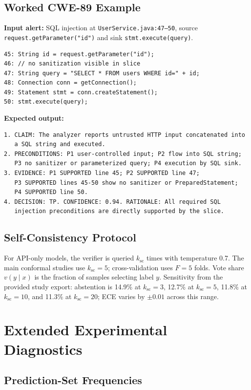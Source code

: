 \subsection{Worked CWE-89 Example}

\textbf{Input alert:} SQL injection at \texttt{UserService.java:47--50}, source \texttt{request.getParameter("id")} and sink \texttt{stmt.execute(query)}.

\begin{verbatim}
45: String id = request.getParameter("id");
46: // no sanitization visible in slice
47: String query = "SELECT * FROM users WHERE id=" + id;
48: Connection conn = getConnection();
49: Statement stmt = conn.createStatement();
50: stmt.execute(query);
\end{verbatim}

\textbf{Expected output:}
\begin{verbatim}
1. CLAIM: The analyzer reports untrusted HTTP input concatenated into
   a SQL string and executed.
2. PRECONDITIONS: P1 user-controlled input; P2 flow into SQL string;
   P3 no sanitizer or parameterized query; P4 execution by SQL sink.
3. EVIDENCE: P1 SUPPORTED line 45; P2 SUPPORTED line 47;
   P3 SUPPORTED lines 45-50 show no sanitizer or PreparedStatement;
   P4 SUPPORTED line 50.
4. DECISION: TP. CONFIDENCE: 0.94. RATIONALE: All required SQL
   injection preconditions are directly supported by the slice.
\end{verbatim}

\subsection{Self-Consistency Protocol}

For API-only models, the verifier is queried $k_{\mathrm{sc}}$ times with temperature 0.7. The main conformal studies use $k_{\mathrm{sc}}=5$; cross-validation uses $F=5$ folds. Vote share $v(y\mid x)$ is the fraction of samples selecting label $y$. Sensitivity from the provided study export: abstention is 14.9\% at $k_{\mathrm{sc}}=3$, 12.7\% at $k_{\mathrm{sc}}=5$, 11.8\% at $k_{\mathrm{sc}}=10$, and 11.3\% at $k_{\mathrm{sc}}=20$; ECE varies by $\pm 0.01$ across this range.

\section{Extended Experimental Diagnostics}
\label{app:experiment_details}

\subsection{Prediction-Set Frequencies}

